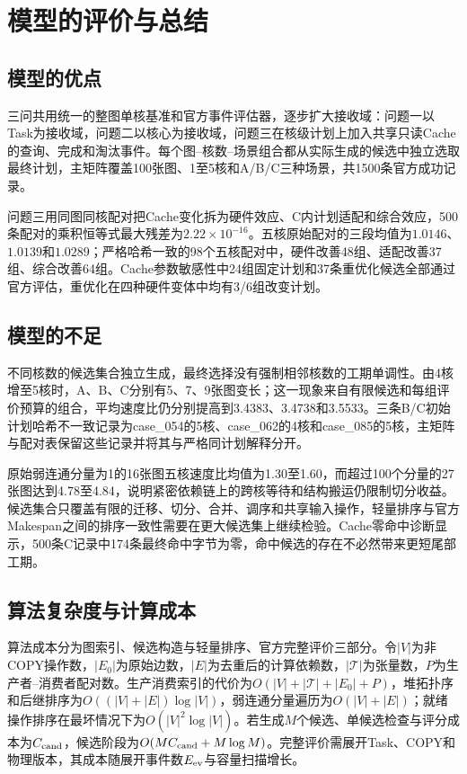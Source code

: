 \section{模型的评价与总结}
\label{sec:evaluation}

\subsection{模型的优点}
三问共用统一的整图单核基准和官方事件评估器，逐步扩大接收域：问题一以Task为接收域，问题二以核心为接收域，问题三在核级计划上加入共享只读Cache的查询、完成和淘汰事件。每个图--核数--场景组合都从实际生成的候选中独立选取最终计划，主矩阵覆盖100张图、1至5核和A/B/C三种场景，共1500条官方成功记录。

问题三用同图同核配对把Cache变化拆为硬件效应、C内计划适配和综合效应，500条配对的乘积恒等式最大残差为$2.22\times10^{-16}$。五核原始配对的三段均值为$1.0146$、$1.0139$和$1.0289$；严格哈希一致的98个五核配对中，硬件改善48组、适配改善37组、综合改善64组。Cache参数敏感性中24组固定计划和37条重优化候选全部通过官方评估，重优化在四种硬件变体中均有3/6组改变计划。

\subsection{模型的不足}
不同核数的候选集合独立生成，最终选择没有强制相邻核数的工期单调性。由4核增至5核时，A、B、C分别有5、7、9张图变长；这一现象来自有限候选和每组评价预算的组合，平均速度比仍分别提高到3.4383、3.4738和3.5533。三条B/C初始计划哈希不一致记录为case\_054的5核、case\_062的4核和case\_085的5核，主矩阵与配对表保留这些记录并将其与严格同计划解释分开。

原始弱连通分量为1的16张图五核速度比均值为1.30至1.60，而超过100个分量的27张图达到4.78至4.84，说明紧密依赖链上的跨核等待和结构搬运仍限制切分收益。候选集合只覆盖有限的迁移、切分、合并、调序和共享输入操作，轻量排序与官方Makespan之间的排序一致性需要在更大候选集上继续检验。Cache零命中诊断显示，500条C记录中174条最终命中字节为零，命中候选的存在不必然带来更短尾部工期。

\subsection{算法复杂度与计算成本}
算法成本分为图索引、候选构造与轻量排序、官方完整评价三部分。令$|V|$为非COPY操作数，$|E_0|$为原始边数，$|E|$为去重后的计算依赖数，$|\mathcal T|$为张量数，$P$为生产者--消费者配对数。生产消费索引的代价为$O(|V|+|\mathcal T|+|E_0|+P)$，堆拓扑序和后继排序为$O((|V|+|E|)\log|V|)$，弱连通分量遍历为$O(|V|+|E|)$；就绪操作排序在最坏情况下为$O(|V|^2\log|V|)$。若生成$M$个候选、单候选检查与评分成本为$C_{\rm cand}$，候选阶段为$O(MC_{\rm cand}+M\log M)$。完整评价需展开Task、COPY和物理版本，其成本随展开事件数$E_{\rm ev}$与容量扫描增长。

